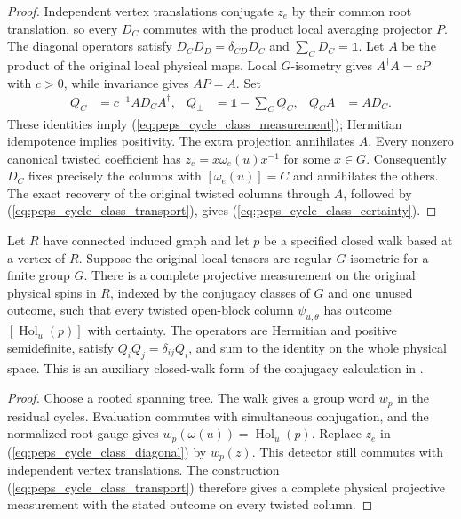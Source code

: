 \begin{proof}\leanok
    Independent vertex translations conjugate $z_e$ by their common
    root translation, so every $D_C$ commutes with the product local
    averaging projector $P$. The diagonal operators satisfy
    $D_CD_D=\delta_{CD}D_C$ and $\sum_C D_C=\mathbb 1$.
    Let $A$ be the product of the original local physical maps.
    Local $G$-isometry gives $A^\dagger A=cP$ with $c>0$, while
    invariance gives $AP=A$. Set
    \begin{align}
        Q_C     & =c^{-1}AD_CA^\dagger,  &
        Q_\perp & =\mathbb 1-\sum_C Q_C, &
        Q_CA    & =AD_C.
        \label{eq:peps_cycle_class_transport}
    \end{align}
    These identities imply (\ref{eq:peps_cycle_class_measurement});
    Hermitian idempotence implies positivity. The extra projection
    annihilates $A$. Every nonzero canonical twisted coefficient has
    $z_e=x\omega_e(u)x^{-1}$ for some $x\in G$. Consequently $D_C$
    fixes precisely the columns with $[\omega_e(u)]=C$ and annihilates
    the others. The exact recovery of the original twisted columns
    through $A$, followed by (\ref{eq:peps_cycle_class_transport}), gives
    (\ref{eq:peps_cycle_class_certainty}).
\end{proof}

\begin{lemma}%
    \label{thm:peps_closed_walk_class_physical_measurement}
    \leanok
    Let $R$ have connected induced graph and let $p$ be a specified
    closed walk based at a vertex of $R$. Suppose the original local
    tensors are regular $G$-isometric for a finite group $G$.
    There is a complete projective measurement on the original physical
    spins in $R$, indexed by the conjugacy classes of $G$ and one unused
    outcome, such that every twisted open-block column
    $\psi_{u,\theta}$ has outcome $[\operatorname{Hol}_u(p)]$ with
    certainty. The operators are Hermitian and positive semidefinite,
    satisfy $Q_iQ_j=\delta_{ij}Q_i$, and sum to the identity on the whole
    physical space. This is an auxiliary closed-walk form of the
    conjugacy calculation in \cite[proof of Theorem~6.15]{Schuch2010PEPS}.
\end{lemma}
\begin{proof}\leanok
    Choose a rooted spanning tree. The walk gives a group word
    $w_p$ in the residual cycles. Evaluation commutes with simultaneous
    conjugation, and the normalized root gauge gives
    $w_p(\omega(u))=\operatorname{Hol}_u(p)$.
    Replace $z_e$ in (\ref{eq:peps_cycle_class_diagonal}) by $w_p(z)$.
    This detector still commutes with independent vertex translations.
    The construction (\ref{eq:peps_cycle_class_transport}) therefore
    gives a complete physical projective measurement with the stated
    outcome on every twisted column.
\end{proof}
